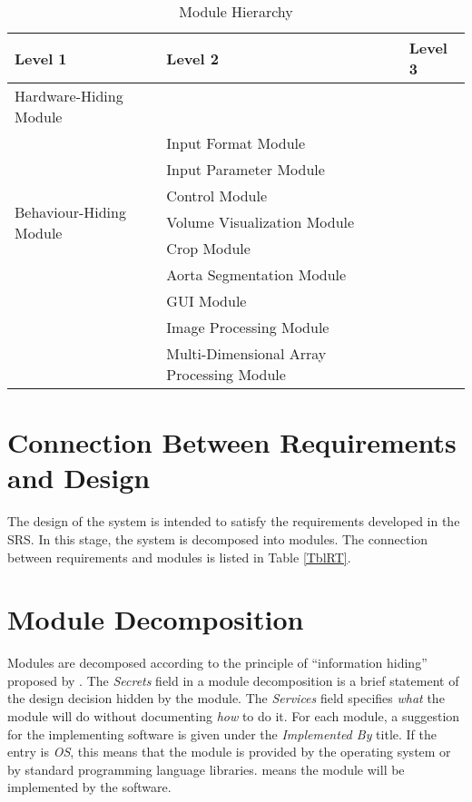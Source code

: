 \documentclass[12pt, titlepage]{article}
\begin{document}
\begin{table}[h!]
\centering
\begin{tabular}{p{} p{}p{}}
\toprule
\textbf{Level 1} & \textbf{Level 2} & \textbf{Level 3}\\
\midrule

{Hardware-Hiding Module} & ~ \\
\midrule

\multirow{7}{0.3\textwidth}{Behaviour-Hiding Module} 
&  Input Format Module & \\
&  Input Parameter Module & \\
& Control Module  & \\
& Volume Visualization Module  & \\
& Crop Module & \\
& Aorta Segmentation Module & \\
\midrule

\multirow{3}{0.3\textwidth}{Software Decision Module}
& GUI Module & \\
& Image Processing Module \\
& Multi-Dimensional Array Processing Module\\
\bottomrule

\end{tabular}
\caption{Module Hierarchy}
\label{TblMH}
\end{table}

\section{Connection Between Requirements and Design} \label{SecConnection}

The design of the system is intended to satisfy the requirements developed in
the SRS. In this stage, the system is decomposed into modules. The connection
between requirements and modules is listed in Table \ref{TblRT}.

\section{Module Decomposition} \label{SecMD}

Modules are decomposed according to the principle of ``information hiding''
proposed by \citet{ParnasEtAl1984}. The \emph{Secrets} field in a module
decomposition is a brief statement of the design decision hidden by the
module. The \emph{Services} field specifies \emph{what} the module will do
without documenting \emph{how} to do it. For each module, a suggestion for the
implementing software is given under the \emph{Implemented By} title. If the
entry is \emph{OS}, this means that the module is provided by the operating
system or by standard programming language libraries.  \emph{\progname{}} means the
module will be implemented by the \progname{} software.
\end{document}
